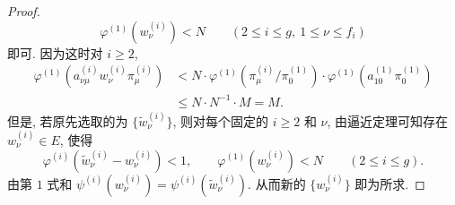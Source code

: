 \begin{proof}
\[
  \varphi^{(1)}(w_{\nu}^{(i)})<N\qquad(2\leqslant i\leqslant g,\ 1\leqslant\nu\leqslant f_i)
\]
即可. 因为这时对 $i\geqslant 2$,
\begin{align*}
  \varphi^{(1)}\left(a_{\nu\mu}^{(i)}w_{\nu}^{(i)}\pi_{\mu}^{(i)}\right)
  &<N\cdot\varphi^{(1)}(\pi_{\mu}^{(i)}/\pi_0^{(1)})\cdot\varphi^{(1)}(a_{10}^{(1)}\pi_0^{(1)})\\
  &\leqslant N\cdot N^{-1}\cdot M=M.
\end{align*}
但是, 若原先选取的为 $\{\widetilde{w}_{\nu}^{(i)}\}$, 则对每个固定的 $i\geqslant 2$ 和 $\nu$, 由逼近定理可知存在 $w_{\nu}^{(i)}\in E$, 使得
\[
  \varphi^{(i)}\left(\widetilde{w}_{\nu}^{(i)}-w_{\nu}^{(i)}\right)<1,\qquad
  \varphi^{(1)}\left(w_{\nu}^{(i)}\right)<N\qquad(2\leqslant i\leqslant g).
\]
由第 $1$ 式和 $\psi^{(i)}(w_{\nu}^{(i)})=\psi^{(i)}(\widetilde{w}_{\nu}^{(i)})$. 从而新的 $\{w_{\nu}^{(i)}\}$ 即为所求.
\end{proof}
